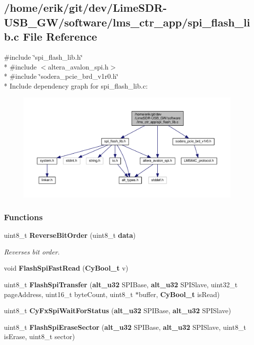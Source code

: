 \subsection{/home/erik/git/dev/\+Lime\+S\+D\+R-\/\+U\+S\+B\+\_\+\+G\+W/software/lms\+\_\+ctr\+\_\+app/spi\+\_\+flash\+\_\+lib.c File Reference}
\label{spi__flash__lib_8c}
{\ttfamily \#include \char`\"{}spi\+\_\+flash\+\_\+lib.\+h\char`\"{}}\\*
{\ttfamily \#include $<$altera\+\_\+avalon\+\_\+spi.\+h$>$}\\*
{\ttfamily \#include \char`\"{}sodera\+\_\+pcie\+\_\+brd\+\_\+v1r0.\+h\char`\"{}}\\*
Include dependency graph for spi\+\_\+flash\+\_\+lib.\+c\+:
\nopagebreak
\begin{figure}[H]
\begin{center}
\leavevmode
\includegraphics[width=350pt]{d8/d84/spi__flash__lib_8c__incl}
\end{center}
\end{figure}
\subsubsection*{Functions}
\begin{DoxyCompactItemize}
\item 
uint8\+\_\+t {\bf Reverse\+Bit\+Order} (uint8\+\_\+t {\bf data})
\begin{DoxyCompactList}\small\item\em Reverses bit order. \end{DoxyCompactList}\item 
void {\bf Flash\+Spi\+Fast\+Read} ({\bf Cy\+Bool\+\_\+t} v)
\item 
uint8\+\_\+t {\bf Flash\+Spi\+Transfer} ({\bf alt\+\_\+u32} S\+P\+I\+Base, {\bf alt\+\_\+u32} S\+P\+I\+Slave, uint32\+\_\+t page\+Address, uint16\+\_\+t byte\+Count, uint8\+\_\+t $\ast$buffer, {\bf Cy\+Bool\+\_\+t} is\+Read)
\item 
uint8\+\_\+t {\bf Cy\+Fx\+Spi\+Wait\+For\+Status} ({\bf alt\+\_\+u32} S\+P\+I\+Base, {\bf alt\+\_\+u32} S\+P\+I\+Slave)
\item 
uint8\+\_\+t {\bf Flash\+Spi\+Erase\+Sector} ({\bf alt\+\_\+u32} S\+P\+I\+Base, {\bf alt\+\_\+u32} S\+P\+I\+Slave, uint8\+\_\+t is\+Erase, uint8\+\_\+t sector)
\end{DoxyCompactItemize}
